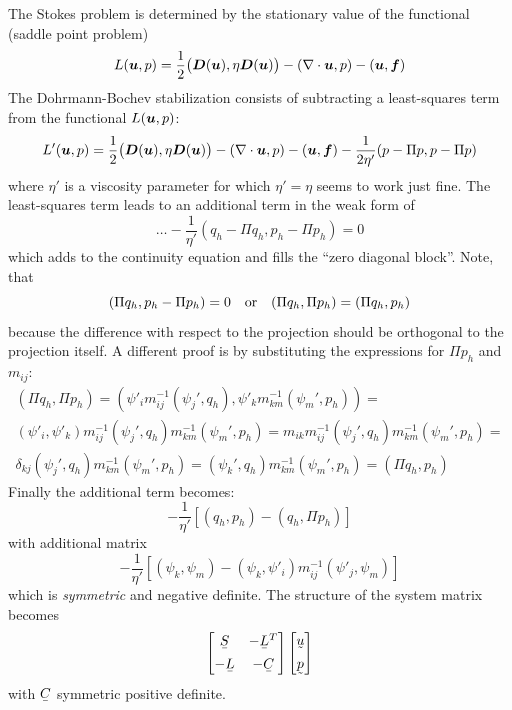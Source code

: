 The Stokes problem is determined by the stationary value of the functional
(saddle point problem)
\[
   L(\boldsymbol{u},p) = \frac12\big(\boldsymbol{D}(\boldsymbol{u}),\eta\boldsymbol{D}(\boldsymbol{u})\big)-
     (\nabla\cdot\boldsymbol{u},p) -(\boldsymbol{u},\boldsymbol{f})
\]
The Dohrmann-Bochev stabilization consists of subtracting a least-squares term
from the functional $L(\boldsymbol{u},p)$:
\[
  L'(\boldsymbol{u},p) = \frac12\big(\boldsymbol{D}(\boldsymbol{u}),\eta\boldsymbol{D}(\boldsymbol{u})\big)-
     (\nabla\cdot\boldsymbol{u},p) -(\boldsymbol{u},\boldsymbol{f})-
     \frac1{2\eta'}(p-\Pi p,p-\Pi p)
\]
where $\eta'$ is a viscosity parameter for which $\eta'=\eta$ seems to work
just fine. The least-squares term leads to an additional term in the weak
 form of
\[
     \dots -\frac1{\eta'}(q_h-\Pi q_h,p_h-\Pi p_h) = 0
\]
which adds to the continuity equation and fills the ``zero diagonal block''.
Note, that 
\[
    (\Pi q_h,p_h-\Pi p_h)=0 \text{\quad or\quad} (\Pi q_h,\Pi p_h)=(\Pi q_h,p_h)
\]
because the difference with respect to the projection should be orthogonal to
the projection itself. A different proof is by substituting the expressions for
$\Pi p_h$ and $m_{ij}$:
\begin{multline*}
  (\Pi q_h,\Pi p_h)=
   (\psi'_i m^{-1}_{ij}(\psi_j',q_h), \psi'_k m^{-1}_{km}(\psi_m',p_h))=\\
   (\psi'_i,\psi'_k) m^{-1}_{ij}(\psi_j',q_h)m^{-1}_{km}(\psi_m',p_h)=
        m_{ik} m^{-1}_{ij}(\psi_j',q_h)m^{-1}_{km}(\psi_m',p_h)=\\
        \delta_{kj}(\psi_j',q_h)m^{-1}_{km}(\psi_m',p_h)=
                   (\psi_k',q_h)m^{-1}_{km}(\psi_m',p_h)=(\Pi q_h,p_h)
\end{multline*}
Finally the additional term becomes:
\[
   -\frac1{\eta'}[(q_h,p_h)-(q_h,\Pi p_h)]
\]
with additional matrix
\[
  -\frac1{\eta'}[(\psi_k,\psi_m)-(\psi_k,\psi'_i)m^{-1}_{ij}(\psi'_j,\psi_m)]
\]
which is \emph{symmetric} and negative definite. The structure of the system
matrix becomes
\[
 \begin{bmatrix}
   \mat{S} &-\mat{L}^T \\[1ex]
   -\mat{L} &-\mat C
 \end{bmatrix}
 \begin{bmatrix}
    \col{u}\\[1ex]
    \col p
 \end{bmatrix}
\]
with $\mat C$ symmetric positive definite.

